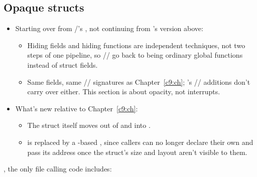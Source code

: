 \subsection{Opaque structs}
\label{c10:a:3}
\begin{itemize}
  \item Starting over from /'s , not continuing from
    's version above:
  \begin{itemize}
    \item Hiding fields and hiding functions are independent techniques, not two steps of one
      pipeline, so // go back to being
      ordinary global functions instead of struct fields.
    \item Same fields, same //
      signatures as Chapter~\ref{c9:ch}; 's
      // additions don't carry over either. This
      section is about opacity, not interrupts.
  \end{itemize}
  \item What's new relative to Chapter~\ref{c9:ch}:
  \begin{itemize}
    \item The struct itself moves out of  and into .
    \item {} is replaced by a -based , since
      callers can no longer declare their own  and pass its address once the struct's
      size and layout aren't visible to them.
  \end{itemize}
\end{itemize}

\noindent{}, the only file calling code includes:

